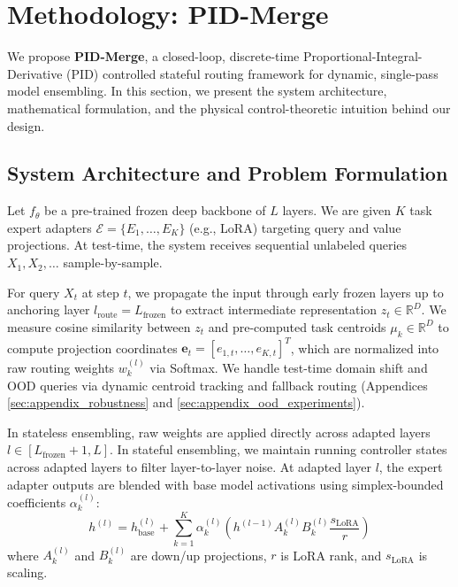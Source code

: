 \section{Methodology: PID-Merge}
\label{sec:method}

We propose \textbf{PID-Merge}, a closed-loop, discrete-time Proportional-Integral-Derivative (PID) controlled stateful routing framework for dynamic, single-pass model ensembling. In this section, we present the system architecture, mathematical formulation, and the physical control-theoretic intuition behind our design.

\subsection{System Architecture and Problem Formulation}
Let $f_\theta$ be a pre-trained frozen deep backbone of $L$ layers. We are given $K$ task expert adapters $\mathcal{E} = \{E_1, \dots, E_K\}$ (e.g., LoRA) targeting query and value projections. At test-time, the system receives sequential unlabeled queries $X_1, X_2, \dots$ sample-by-sample. 

For query $X_t$ at step $t$, we propagate the input through early frozen layers up to anchoring layer $l_{\text{route}} = L_{\text{frozen}}$ to extract intermediate representation $z_t \in \mathbb{R}^D$. We measure cosine similarity between $z_t$ and pre-computed task centroids $\mu_k \in \mathbb{R}^D$ to compute projection coordinates $\mathbf{e}_t = [e_{1,t}, \dots, e_{K,t}]^T$, which are normalized into raw routing weights $w_k^{(l)}$ via Softmax. We handle test-time domain shift and OOD queries via dynamic centroid tracking and fallback routing (Appendices \ref{sec:appendix_robustness} and \ref{sec:appendix_ood_experiments}).

In stateless ensembling, raw weights are applied directly across adapted layers $l \in [L_{\text{frozen}}+1, L]$. In stateful ensembling, we maintain running controller states across adapted layers to filter layer-to-layer noise. At adapted layer $l$, the expert adapter outputs are blended with base model activations using simplex-bounded coefficients $\alpha_k^{(l)}$:
\begin{equation}
h^{(l)} = h_{\text{base}}^{(l)} + \sum_{k=1}^K \alpha_k^{(l)} \left( h^{(l-1)} A_k^{(l)} B_k^{(l)} \frac{s_{\text{LoRA}}}{r} \right)
\label{eq:blending}
\end{equation}
where $A_k^{(l)}$ and $B_k^{(l)}$ are down/up projections, $r$ is LoRA rank, and $s_{\text{LoRA}}$ is scaling.

